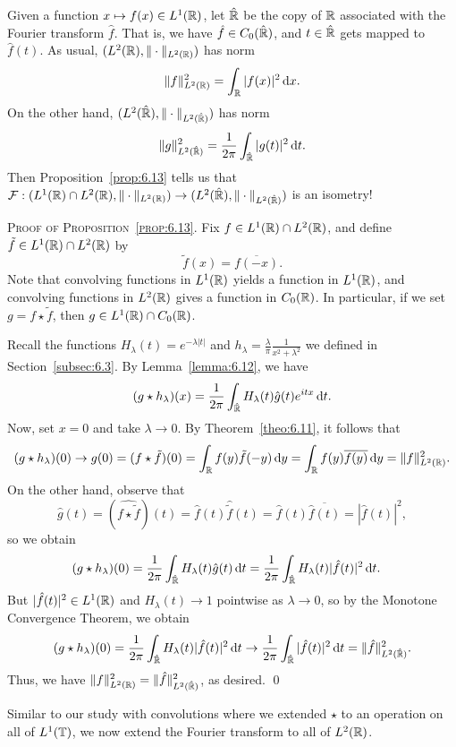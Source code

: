 Given a function $x \mapsto f(x) \in L^1(\mathbb{R})$, let $\hat {\mathbb{R}}$ be the copy of 
$\mathbb{R}$ associated with the Fourier transform $\hat f$. That is, we have 
$\hat f \in C_0(\hat {\mathbb{R}})$, and $t \in \hat {\mathbb{R}}$ gets mapped to $\hat f(t)$.
As usual, $(L^2(\mathbb{R}), \|\cdot\|_{L^2(\mathbb{R})})$ has norm 
\[ \|f\|_{L^2(\mathbb{R})}^2 = \int_{\mathbb{R}} |f(x)|^2\,\mathrm{d} x. \] 
On the other hand, $(L^2(\hat {\mathbb{R}}), \|\cdot\|_{L^2(\hat{\mathbb{R}})})$ has norm 
\[ \|g\|_{L^2(\hat {\mathbb{R}})}^2 = \frac{1}{2\pi} \int_{\hat {\mathbb{R}}} |g(t)|^2 \,\mathrm{d} t. \]   
Then Proposition~\ref{prop:6.13} tells us that ${\cal F} : 
(L^1(\mathbb{R}) \cap L^2(\mathbb{R}), \|\cdot\|_{L^2(\mathbb{R})}) \to (L^2(\hat {\mathbb{R}}), 
\|\cdot\|_{L^2(\hat{\mathbb{R}})})$ is an isometry! 

\textsc{Proof of Proposition~\ref{prop:6.13}.} Fix $f \in L^1(\mathbb{R}) 
\cap L^2(\mathbb{R})$, and define $\tilde f \in L^1(\mathbb{R}) \cap L^2(\mathbb{R})$ by 
\[ \tilde f(x) = \overline{f(-x)}. \] 
Note that convolving functions in $L^1(\mathbb{R})$ yields a function in $L^1(\mathbb{R})$, 
and convolving functions in $L^2(\mathbb{R})$ gives a function in $C_0(\mathbb{R})$. 
In particular, if we set $g = f \star \tilde f$, then $g \in 
L^1(\mathbb{R}) \cap C_0(\mathbb{R})$. 

Recall the functions $H_\lambda(t) = e^{-\lambda|t|}$ and 
$h_\lambda = \frac{\lambda}{\pi} \frac{1}{x^2 + \lambda^2}$ we defined 
in Section~\ref{subsec:6.3}. By Lemma~\ref{lemma:6.12}, we have 
\[ (g \star h_\lambda)(x) = \frac{1}{2\pi} \int_{\hat {\mathbb{R}}} H_\lambda(t)
\hat g(t) e^{itx} \,\mathrm{d} t. \]
Now, set $x = 0$ and take $\lambda \to 0$. By Theorem~\ref{theo:6.11}, 
it follows that 
\[ (g \star h_\lambda)(0) \to g(0) = (f \star \tilde f)(0) 
= \int_{\mathbb{R}} f(y) \tilde f(-y) \,\mathrm{d} y = \int_{\mathbb{R}} f(y) \overline{f(y)} \,\mathrm{d} y 
= \|f\|_{L^2(\mathbb{R})}^2. \] 
On the other hand, observe that 
\[ \hat g(t) = (\widehat{f \star \tilde f})(t) = \hat f(t) \hat{\tilde f}(t) 
= \hat f(t) \overline{\hat f(t)} = |\hat f(t)|^2, \] 
so we obtain 
\begin{align*}
    (g \star h_\lambda)(0) 
    &= \frac{1}{2\pi} \int_{\hat {\mathbb{R}}} H_\lambda(t) \hat g(t) \,\mathrm{d} t 
    = \frac{1}{2\pi} \int_{\hat {\mathbb{R}}} H_\lambda(t) |\hat f(t)|^2\,\mathrm{d} t. 
\end{align*}
But $|\hat f(t)|^2 \in L^1(\mathbb{R})$ and $H_\lambda(t) \to 1$ pointwise as
$\lambda \to 0$, so by the Monotone Convergence Theorem, we obtain 
\[ (g \star h_\lambda)(0) = 
\frac{1}{2\pi} \int_{\hat {\mathbb{R}}} H_\lambda(t) |\hat f(t)|^2\,\mathrm{d} t 
\to \frac{1}{2\pi} \int_{\hat {\mathbb{R}}} |\hat f(t)|^2\,\mathrm{d} t 
= \|\hat f\|_{L^2(\hat{\mathbb{R}})}^2. \] 
Thus, we have $\|f\|_{L^2(\mathbb{R})}^2 = \|\hat f\|_{L^2(\hat{\mathbb{R}})}^2$, as desired. \qed

Similar to our study with convolutions where we extended $\star$ 
to an operation on all of $L^1(\mathbb{T})$, we now extend the Fourier transform 
to all of $L^2(\mathbb{R})$. 

